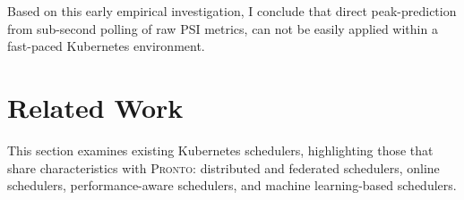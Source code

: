 Based on this early empirical investigation, I conclude that direct
peak-prediction from sub-second polling of raw PSI metrics, can not be easily
applied within a fast-paced Kubernetes environment.


%
%
%


\section{Related Work}
This section examines existing Kubernetes schedulers, highlighting
those that share characteristics with \textsc{Pronto}: distributed and federated
schedulers, online schedulers, performance-aware schedulers, and machine
learning-based schedulers.

